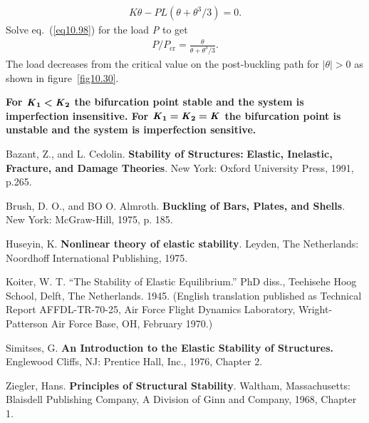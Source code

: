 \documentclass{AeroStructure-ERJohnson}
\begin{document}
\begin{align}\label{eq10.98}
K \theta-P L(\theta+\theta^{3} / 3)=0.
\end{align}
Solve eq.~(\ref{eq10.98}) for the load \textit{P} to get
\begin{align}\label{eq10.99}
P / P_{\mathrm{cr}}=\frac{\theta}{\theta+\theta^{3} / 3}.
\end{align}
The load decreases from the critical value on the post-buckling path for $|\theta|>0$ as shown in figure~\ref{fig10.30}.

{\def\thefigure{10.30}
}

\textbf{For} $\textbf{\textit{K}}_{\textbf{1}} \boldsymbol{<} \textbf{\textit{K}}_{\textbf{2}}$ \textbf{the bifurcation point stable and the system is imperfection insensitive. For} $\textbf{\textit{K}}_{\textbf{1}} \boldsymbol{=} \textbf{\textit{K}}_{\textbf{2}} \boldsymbol{=} \textbf{\textit{K}}$ \textbf{the bifurcation point is unstable and the system is imperfection sensitive.}


\begin{thebibliography}{}\label{sec10.7}
\bibitem{}
Bazant, Z., and L. Cedolin. \textbf{Stability of Structures:} \textbf{Elastic, Inelastic, Fracture, and Damage Theories}. New York: Oxford University Press, 1991, p.265.

\bibitem{}
Brush, D. O., and BO O. Almroth. \textbf{Buckling of Bars, Plates, and Shells}. New York: McGraw-Hill, 1975, p. 185.

\bibitem{}
Huseyin, K. \textbf{Nonlinear theory of elastic stability}. Leyden, The Netherlands: Noordhoff International Publishing, 1975.

\bibitem{}
Koiter, W. T. ``The Stability of Elastic Equilibrium.'' PhD diss., Teehisehe Hoog School, Delft, The Netherlands. 1945. (English translation published as Technical Report AFFDL-TR-70-25, Air Force Flight Dynamics Laboratory, Wright-Patterson Air Force Base, OH, February 1970.)

\bibitem{}
Simitses, G. \textbf{An Introduction to the Elastic Stability of Structures.} Englewood Cliffs, NJ: Prentice Hall, Inc., 1976, Chapter 2.

\bibitem{}
Ziegler, Hans. \textbf{Principles of Structural Stability}. Waltham, Massachusetts: Blaisdell Publishing Company, A Division of Ginn and Company, 1968, Chapter 1.
\end{thebibliography}
\end{document}
